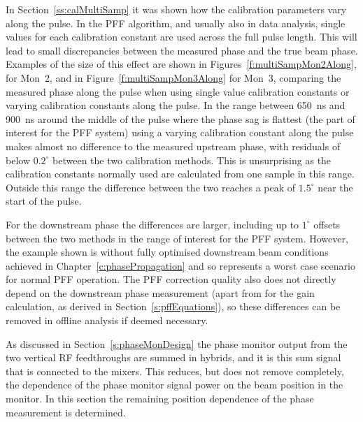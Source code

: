 In Section~\ref{ss:calMultiSamp} it was shown how the calibration parameters vary along the pulse. In the PFF algorithm, and usually also in data analysis, single values for each calibration constant are used across the full pulse length. This will lead to small discrepancies between the measured phase and the true beam phase. Examples of the size of this effect are shown in Figures~\ref{f:multiSampMon2Along}, for Mon~2, and in Figure~\ref{f:multiSampMon3Along} for Mon~3, comparing the measured phase along the pulse when using single value calibration constants or varying calibration constants along the pulse. In the range between 650~ns and 900~ns around the middle of the pulse where the phase sag is flattest (the part of interest for the PFF system) using a varying calibration constant along the pulse makes almost no difference to the measured upstream phase, with residuals of below \(0.2^\circ\) between the two calibration methods. This is unsurprising as the calibration constants normally used are calculated from one sample in this range. Outside this range the difference between the two reaches a peak of \(1.5^\circ\) near the start of the pulse.

For the downstream phase the differences are larger, including up to \(1^\circ\) offsets between the two methods in the range of interest for the PFF system. However, the example shown is without fully optimised downstream beam conditions achieved in Chapter~\ref{c:phasePropagation} and so represents a worst case scenario for normal PFF operation. The PFF correction quality also does not directly depend on the downstream phase measurement (apart from for the gain calculation, as derived in Section~\ref{s:pffEquations}), so these differences can be removed in offline analysis if deemed necessary.






As discussed in Section~\ref{s:phaseMonDesign} the phase monitor output from the two vertical RF feedthroughs are summed in hybrids, and it is this sum signal that is connected to the mixers. This reduces, but does not remove completely, the dependence of the phase monitor signal power on the beam position in the monitor. In this section the remaining position dependence of the phase measurement is determined.

